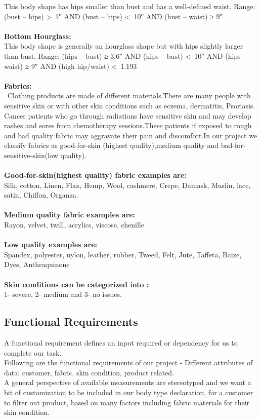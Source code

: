 \documentclass[11pt,journal,compsoc]{IEEEtran}
\begin{document}
This body shape has hips smaller than bust and has a well-defined waist.
Range: (bust – hips) \textgreater \ 1″ AND (bust – hips) \textless \ 10″ AND (bust – waist) ≥ 9″ \\\\
\textbullet\textbf{Bottom Hourglass:} \\
This body shape is generally an hourglass shape but with hips slightly larger than bust.
 Range: (hips – bust) ≥ 3.6″ AND (hips – bust) \textless \ 10″ AND (hips – waist) ≥ 9″ AND (high hip/waist) \textless \ 1.193 \\\\
\textbullet\textbf{Fabrics:}\\
\ Clothing products are made of different materials.There are many people with sensitive skin or with other skin conditions such as eczema, dermatitis, Psoriasis. Cancer patients who go through radiations have sensitive skin and may develop rashes and sores from chemotherapy sessions.These patients if exposed to rough and bad quality fabric may aggravate their pain and discomfort.In our project we classify fabrics as good-for-skin (highest quality),medium quality and bad-for-sensitive-skin(low quality). \\\\
\textbullet\textbf{Good-for-skin(highest quality) fabric examples are:}\\ Silk, cotton, Linen, Flax, Hemp, Wool, cashmere, Crepe, Damask, Muslin, lace, satin, Chiffon, Organza. \\\\
\textbullet\textbf{Medium quality fabric examples are:}\\ Rayon, velvet, twill, acrylics, viscose, chenille\\\\
\textbullet\textbf{Low quality examples are:}\\
Spandex, polyester, nylon, leather, rubber, Tweed, Felt, 
Jute, Taffeta, Baize, Dyes, Anthraquinone \\\\
\textbullet\textbf{Skin conditions can be categorized into :}\\ 
1- severe, 2- medium and 3- no issues.
\subsection{Functional Requirements} 
A functional requirement defines an input required or dependency for us to complete our task. \\Following are the functional requirements of our project - Different attributes of data: customer, fabric, skin condition, product related. \\
A general perspective of available measurements are stereotyped and we want a bit of customization to be included in our body type declaration, for a customer to filter out product, based on many factors including fabric materials for their skin condition.
\end{document}
